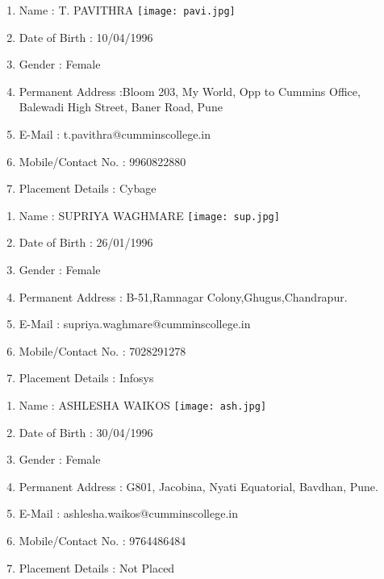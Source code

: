\documentclass[oneside,a4paper,12pt]{book}
\begin{document}
\begin{appendices}
\begin{enumerate}
\end{enumerate}
\newpage
\begin{enumerate}
\item Name : T. PAVITHRA \hspace{50 mm}\texttt{[image: pavi.jpg]}
\item Date of Birth : 10/04/1996
\item Gender : Female
\item Permanent Address :Bloom 203, My World, Opp to Cummins Office, Balewadi High Street, Baner Road, Pune 
\item E-Mail : t.pavithra@cumminscollege.in
\item Mobile/Contact No. : 9960822880
\item Placement Details : Cybage


\end{enumerate}
\newpage
\begin{enumerate}
\item Name : SUPRIYA WAGHMARE \hspace{50 mm}\texttt{[image: sup.jpg]}
\item Date of Birth : 26/01/1996
\item Gender : Female
\item Permanent Address : B-51,Ramnagar Colony,Ghugus,Chandrapur.
\item E-Mail : supriya.waghmare@cumminscollege.in
\item Mobile/Contact No. : 7028291278
\item Placement Details : Infosys

\newpage
\end{enumerate}
\begin{enumerate}
\item Name : ASHLESHA WAIKOS \hspace{50 mm}\texttt{[image: ash.jpg]}
\item Date of Birth : 30/04/1996
\item Gender : Female
\item Permanent Address : G801, Jacobina, Nyati Equatorial, Bavdhan, Pune.
\item E-Mail : ashlesha.waikos@cumminscollege.in
\item Mobile/Contact No. : 9764486484
\item Placement Details : Not Placed


\end{enumerate}
\end{appendices}
\end{document}
